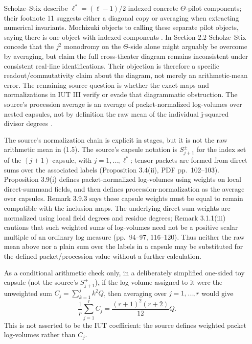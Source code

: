 \documentclass[11pt]{article}
\begin{document}
Scholze--Stix describe $\ell^*=(\ell-1)/2$ indexed concrete $\Theta$-pilot components; their footnote 11 suggests either a diagonal copy or averaging when extracting numerical invariants. Mochizuki objects to calling these separate pilot objects, saying there is one object with indexed components \cite[(C10), p.~3]{MochizukiResponse}. In Section 2.2 Scholze--Stix concede that the $j^2$ monodromy on the $\Theta$-side alone might arguably be overcome by averaging, but claim the full cross-theater diagram remains inconsistent under consistent real-line identifications. Their objection is therefore a specific readout/commutativity claim about the diagram, not merely an arithmetic-mean error. The remaining source question is whether the exact maps and normalizations in IUT III verify or evade that diagrammatic obstruction. The source's procession average is an average of packet-normalized log-volumes over nested capsules, not by definition the raw mean of the individual j-squared divisor degrees \cite[Section 2.1.8, footnote 11; Section 2.2, especially (1.5)--(1.6)]{SS}.

The source's normalization chain is explicit in stages, but it is not the raw arithmetic mean in (1.5). The source's capsule notation is $S_{j+1}^{\pm}$ for the index set of the $(j+1)$-capsule, with $j=1,\ldots,\ell^*$; tensor packets are formed from direct sums over the associated labels (Proposition 3.4(ii), PDF pp.~102--103). Proposition 3.9(i) defines packet-normalized log-volumes using weights on local direct-summand fields, and then defines procession-normalization as the average over capsules. Remark 3.9.3 says these capsule weights must be equal to remain compatible with the inclusion maps. The underlying direct-sum weights are normalized using local field degrees and residue degrees; Remark 3.1.1(iii) cautions that such weighted sums of log-volumes need not be a positive scalar multiple of an ordinary log measure (pp.~94--97, 116--120). Thus neither the raw mean above nor a plain sum over the labels in a capsule may be substituted for the defined packet/procession value without a further calculation.

As a conditional arithmetic check only, in a deliberately simplified one-sided toy capsule (not the source's $S_{j+1}^{\pm}$), if the log-volume assigned to it were the unweighted sum $C_j=\sum_{k=1}^{j} k^2 Q$, then averaging over $j=1,\ldots,r$ would give
\[
\frac{1}{r}\sum_{j=1}^{r}C_j=\frac{(r+1)^2(r+2)}{12}Q.
\]
This is not asserted to be the IUT coefficient: the source defines weighted packet log-volumes rather than $C_j$.
\end{document}
